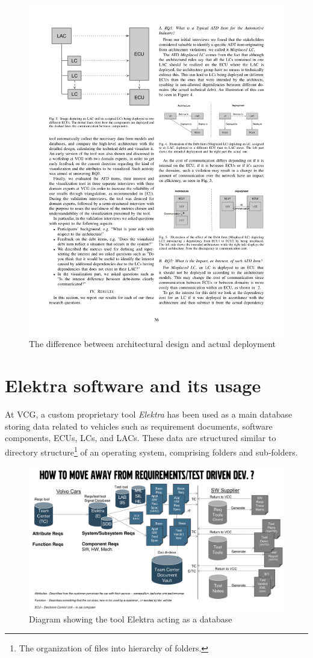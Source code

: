 \begin{figure}[H]
\centering
\captionsetup{justification=centering}
\vspace{0cm}%
\includegraphics[width=0.7\linewidth]{figure/literatures/eliasson_atd.pdf}
\caption{The difference between architectural design and actual deployment \cite{Eliasson_2}}
\label{fig:eliasson_atd}
\end{figure}


\section{Elektra software and its usage}
At VCG, a custom proprietary tool \textit{Elektra} has been used as a main database storing data related to vehicles such as requirement documents, software components, ECUs, LCs, and LACs. These data are structured similar to directory structure\footnote{The organization of files into hierarchy of folders.} of an operating system, comprising folders and sub-folders. \todo{[to be filled in]}

\begin{figure}[H]
\centering
\captionsetup{justification=centering}
\vspace{0cm}%
\includegraphics[width=0.95\linewidth]{figure/literatures/niesel_elektra.pdf}
\caption{Diagram showing the tool Elektra acting as a database \cite{Niesel}}
\label{fig:niesel-elektra}
\end{figure}

